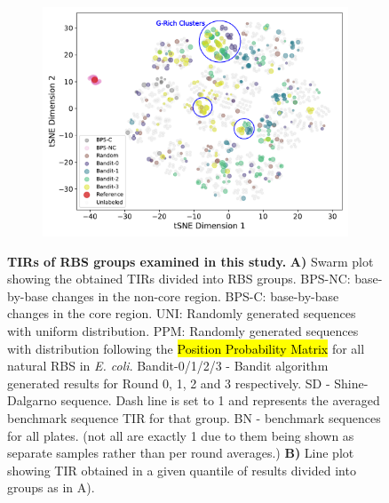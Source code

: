 \documentclass{article}
\begin{document}
\begin{figure}[!ht]
\begin{subfigure}[b]{0.48\textwidth}
    \end{subfigure}
    \begin{subfigure}[b]{0.48\textwidth}
        \centering
        \caption{}
        \includegraphics[scale=0.42]{plots/Main_Paper/tsneplot.pdf}
    \end{subfigure}
    \caption{
    \textbf{TIRs of RBS groups examined in this study.} 
    \textbf{A)} Swarm plot showing the obtained TIRs divided into RBS groups.
    BPS-NC: base-by-base changes in the non-core region. 
    BPS-C: base-by-base changes in the core region. 
    UNI: Randomly generated sequences with uniform distribution. 
    PPM: Randomly generated sequences with distribution following the \hl{Position Probability Matrix} for all natural RBS in \emph{E. coli}. 
    Bandit-0/1/2/3 - Bandit algorithm generated results for Round 0, 1, 2 and 3 respectively.
    SD - Shine-Dalgarno sequence.
    Dash line is set to 1 and represents the averaged benchmark sequence TIR for that group. 
    BN - benchmark sequences for all plates. 
    (not all are exactly 1 due to them being shown as separate samples rather than per round averages.)
    \textbf{B)} Line plot showing TIR obtained in a given quantile of results divided into groups as in A).
}
\end{figure}
\end{document}
